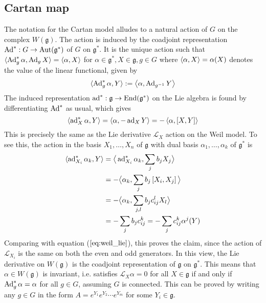 \subsection{Cartan map}
The notation for the Cartan model alludes to a natural action of  $G$
on the complex $W(\mathfrak{g})$. The action is induced by the
coadjoint representation $\operatorname{Ad}^* :G \to \operatorname{Aut}(\mathfrak{g}^*)$ of  
$G$ on  $\mathfrak{g}^*$. It is the unique action
such that $\gen[*]{\Ad_g^* \alpha, \Ad_g X} = \gen{\alpha, X}$ for
$\alpha\in\mathfrak{g}^*,X\in\mathfrak{g},g\in G$ where $\gen{\alpha,X}=\alpha(X)$ 
denotes the value of the linear functional, given by
\begin{equation} \label{eq:group_coadjoint_action}
	\gen[*]{\Ad^*_g \alpha, Y} := \gen{\alpha,\Ad_{g^{-1}} Y}
\end{equation}
The induced representation $\operatorname{ad}^* : \mathfrak{g} \to
\operatorname{End}(\mathfrak{g}^*)$ on the Lie algebra is found by
differentiating $\operatorname{Ad}^*$ as usual, which gives
\begin{equation} \label{eq:coadjoint_action}
	 \gen{\ad_X^* \alpha, Y} = \gen{\alpha, -\ad_X Y} = -\gen{\alpha,[X,Y]}
\end{equation}
This is precisely the same as the Lie derivative $\mathcal{L}_X$ action on 
the Weil model. To see this, the action in the basis
$X_1,\ldots,X_n$ of $\mathfrak{g}$ with dual basis
$\alpha_1,\ldots,\alpha_k$ of $\mathfrak{g}^*$ is
\begin{align*}
	\gen[*]{\ad_{X_i}^*\alpha_k,Y} 
	&= \gen[1]{\ad_{X_i}^*\alpha_k,\sum_j b_j X_j}  \\
	&= -\gen[1]{\alpha_k, \sum_jb_j\bracket{X_i,X_j}} \\
	&= -\gen[1]{\alpha_k, \sum_{j,l}b_jc_{ij}^lX_l} \\
	&= -\sum_{j}b_jc_{ij}^k 
	= -\sum_{j} c_{ij}^k \alpha^j(Y) 
\end{align*}
Comparing with equation ($\ref{eq:weil_lie}$), this proves the claim, since the
action of $\mathcal{L}_{X_i}$ is the same on both the even and odd generators. 
In this view, the Lie derivative on $W(\mathfrak{g})$ is the coadjoint representation of 
$\mathfrak{g}$ on $\mathfrak{g}^*$. This means that $\alpha \in
W(\mathfrak{g})$ is invariant, i.e. satisfies $\mathcal{L}_X\alpha = 0$ for all
$X\in\mathfrak{g}$ if and only if  $\operatorname{Ad}_g^* \alpha = \alpha$ for all  $g\in G$, 
assuming $G$ is connected. This can be proved by writing any $g\in G$ 
in the form  $A=e^{Y_1}e^{Y_2}\cdots e^{Y_m}$ for some
$Y_i\in\mathfrak{g}$.\cite[Corollary 3.47]{hall}

